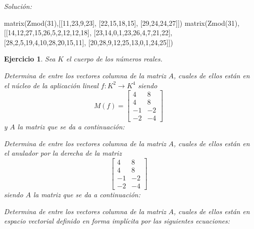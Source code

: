 \documentclass[12pt]{amsart}
\newtheorem{ejer}{Ejercicio}
\begin{document}
{\it Soluci\'on:}

\begin{sageblock}
matrix(Zmod(31),[[11,23,9,23],
[22,15,18,15],
[29,24,24,27]])
matrix(Zmod(31),[[14,12,27,15,26,5,2,12,12,18],
[23,14,0,1,23,26,4,7,21,22],
[28,2,5,19,4,10,28,20,15,11],
[20,28,9,12,25,13,0,1,24,25]])
\end{sageblock}



\begin{ejer} Sea $K$ el cuerpo de los n\'umeros reales.
\newline
\noindent\begin{minipage}{\textwidth}
\begin{tcolorbox}[colback = green!20!white,title=Versión Núcleo]
Determina de entre los vectores columna de la matriz $A$, cuales de ellos están en el núcleo de la aplicación lineal $f:K^{2} \to K^{4}$ siendo  $$ M(f) = \left[\begin{array}{rr}
4 & 8 \\
4 & 8 \\
-1 & -2 \\
-2 & -4
\end{array}\right] $$ y $A$ la matriz que se da a continuación:\end{tcolorbox}
\end{minipage} \newline
\noindent\begin{minipage}{\textwidth}
\begin{tcolorbox}[colback = blue!20!white,title=Versión Anulador]
Determina de entre los vectores columna de la matriz $A$, cuales de ellos están en el anulador por la derecha de la matriz $$ \left[\begin{array}{rr}
4 & 8 \\
4 & 8 \\
-1 & -2 \\
-2 & -4
\end{array}\right] $$ siendo $A$ la matriz que se da a continuación:\end{tcolorbox}
\end{minipage} \newline
\noindent\begin{minipage}{\textwidth} 
\begin{tcolorbox}[colback = red!20!white,title=Versión Ecuaciones Implícitas]
Determina de entre los vectores columna de la matriz $A$, cuales de ellos están en espacio vectorial definido en forma implícita por las siguientes ecuaciones:

\end{tcolorbox}
\end{minipage}
\end{ejer}
\end{document}
